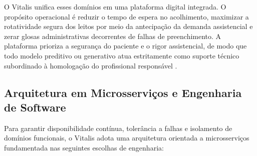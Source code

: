 O Vitalis unifica esses domínios em uma plataforma digital integrada. O propósito operacional é reduzir o tempo de espera no acolhimento, maximizar a rotatividade segura dos leitos por meio da antecipação da demanda assistencial e zerar glosas administrativas decorrentes de falhas de preenchimento. A plataforma prioriza a segurança do paciente e o rigor assistencial, de modo que todo modelo preditivo ou generativo atua estritamente como suporte técnico subordinado à homologação do profissional responsável \cite{topol:2019}.

\subsection{Arquitetura em Microsserviços e Engenharia de Software}
\label{subsec:arquitetura_software}

Para garantir disponibilidade contínua, tolerância a falhas e isolamento de domínios funcionais, o Vitalis adota uma arquitetura orientada a microsserviços fundamentada nas seguintes escolhas de engenharia:

